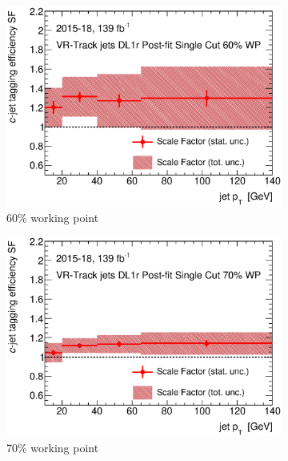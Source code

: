 \begin{figure}[H]
	\centering
	\begin{subfigure}[t]{.35\linewidth}
		\includegraphics[width=1\textwidth]{FTAG_plots/DL1rallVRJetsDec/SF60.eps}
		\caption{60\% working point}
			\end{subfigure}
		\begin{subfigure}[t]{.35\linewidth}
			\includegraphics[width=1\textwidth]{FTAG_plots/DL1rallVRJetsDec/SF70.eps}
			\caption{70\% working point}
		\end{subfigure}
		\begin{subfigure}[t]{.35\linewidth}

\end{subfigure}
\end{figure}
